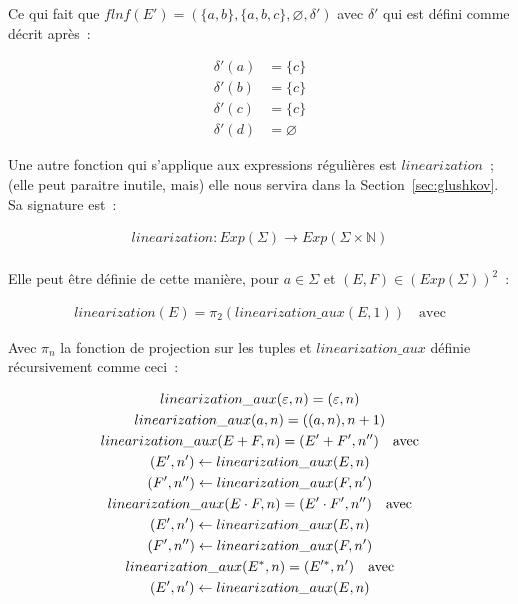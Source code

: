 \begin{example}
    Ce qui fait que \(flnf(E') = (\{a, b\}, \{a, b, c\}, \varnothing,
    \delta')\) avec \(\delta'\) qui est défini comme décrit après~:

    \begin{align*}
        \delta'(a) & = \{c\}       \\
        \delta'(b) & = \{c\}       \\
        \delta'(c) & = \{c\}       \\
        \delta'(d) & = \varnothing
    \end{align*}

\end{example}

\vphantom{}

Une autre fonction qui s'applique aux expressions régulières est
\(linearization\)~; (elle peut paraitre inutile, mais) elle nous servira dans
la Section~\ref{sec:glushkov}. Sa signature est~:

\begin{gather*}
    linearization: Exp(\Sigma) \to Exp(\Sigma \times \mathbb{N}) \\
\end{gather*}

Elle peut être définie de cette manière, pour \(a \in \Sigma\) et \((E, F) \in
(Exp(\Sigma))^2\)~:

\begin{gather*}
    linearization(E) = \pi_2(linearization\_aux(E, 1)) \quad \text{avec}
\end{gather*}

\noindent Avec \(\pi_n\) la fonction de projection sur les tuples et
\(linearization\_aux\) définie récursivement comme ceci~:

\begin{gather*}
    linearization\_aux(\varepsilon, n) = (\varepsilon, n) \\
    linearization\_aux(a, n) = ((a, n), n + 1) \\
    linearization\_aux(E + F, n) = (E' + F', n'') \quad \text{avec} \\
    (E', n') \leftarrow linearization\_aux(E, n) \notag \\
    (F', n'') \leftarrow linearization\_aux(F, n') \notag \\
    linearization\_aux(E \cdot F, n) = (E' \cdot F', n'') \quad \text{avec} \\
    (E', n') \leftarrow linearization\_aux(E, n) \notag \\
    (F', n'') \leftarrow linearization\_aux(F, n') \notag \\
    linearization\_aux(E^*, n) = (E'^*, n') \quad \text{avec} \\
    (E', n') \leftarrow linearization\_aux(E, n) \notag
\end{gather*}

